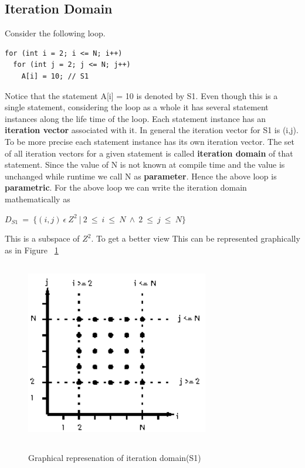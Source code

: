 \subsection{Iteration Domain}
Consider the following loop.
{\footnotesize
\begin{lstlisting}
for (int i = 2; i <= N; i++)
  for (int j = 2; j <= N; j++)
    A[i] = 10; // S1
\end{lstlisting}
}
Notice that the statement A[i] = 10 is denoted by S1. Even though this is a single statement, considering
the loop as a whole it has several statement instances along the life time of the loop. Each statement
instance has an \textbf{iteration vector} associated with it. In general the iteration vector for S1 is (i,j).
To be more precise each statement instance has its own iteration vector. The set of all iteration vectors
for a given statement is called \textbf{iteration domain} of that statement. Since the value of N
is not known at compile time and the value is unchanged while runtime we call N as \textbf{parameter}.
Hence the above loop is \textbf{parametric}. For the above loop we can write the iteration domain mathematically as
\begin{center}
$D_{S1}\ =\ \{(i,j)\ \epsilon\ Z^2\ |\ 2\ \leq\ i\ \leq\ N\ \wedge\ 2\ \leq\ j\ \leq\ N\}$
\end{center}
This is a subspace of $Z^2$. To get a better view This can be represented graphically as in Figure ~\ref{fig:iter}
\begin{figure}
\begin{center}
  \label{fig:iter}
  \includegraphics[height=8cm,width=8cm]{images/iter.eps}
  \caption{Graphical represenation of iteration domain(S1)}
\end{center}  
\end{figure}

